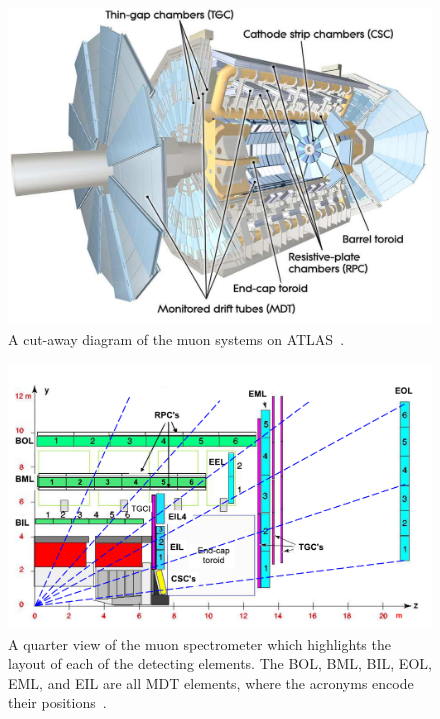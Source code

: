 \begin{figure}[hbtp]
\includegraphics[width=\fullfig]{figures/muon_overview.pdf}
\caption{A cut-away diagram of the muon systems on ATLAS~\cite{atlas_experiment}.}
\label{fig:muon_overview}
\end{figure}

\begin{figure}[hbtp]
\includegraphics[width=\fullfig]{figures/muon_side_schematic.pdf}
\caption{A quarter view of the muon spectrometer which highlights the layout of each of the detecting elements. The BOL, BML, BIL, EOL, EML, and EIL are all \acs*{MDT} elements, where the acronyms encode their positions~\cite{atlas_experiment}.}
\label{fig:muon_side_schematic}
\end{figure}

